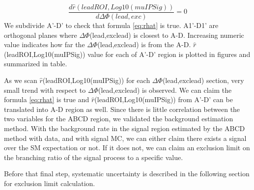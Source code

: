 \begin{equation}
\label{eq:rhat}
	\frac{d\hat{r}(leadROI,Log10(muIPSig))}{d\Delta\Phi(lead,exc)}=0
\end{equation}
We subdivide A'-D' to check that formula \ref{eq:rhat} is true.
A1'-D1' are orthogonal planes where $\Delta\Phi$(lead,exclead) is closest to A-D. 
Increasing numeric value indicates how far the $\Delta\Phi$(lead,exclead) is from the A-D. 
$\hat{r}$(leadROI,Log10(muIPSig)) value for each of A'-D' region is plotted in figures and summarized in table.



As we scan $\hat{r}$(leadROI,Log10(muIPSig)) for each $\Delta\Phi$(lead,exclead) section, very small trend with respect to $\Delta\Phi$(lead,exclead) is observed.
We can claim the formula \ref{eq:rhat} is true and \newline $\hat{r}$(leadROI,Log10(muIPSig)) from A'-D' can be translated into A-D region as well.
Since there is little correlation between the two variables for the ABCD region, we validated the background estimation method.
With the background rate in the signal region estimated by the ABCD method with data, and with signal MC, we can either claim there exists a signal over the SM expectation or not.
If it does not, we can claim an exclusion limit on the branching ratio of the signal process to a specific value.

Before that final step, systematic uncertainty is described in the following section for exclusion limit calculation.

